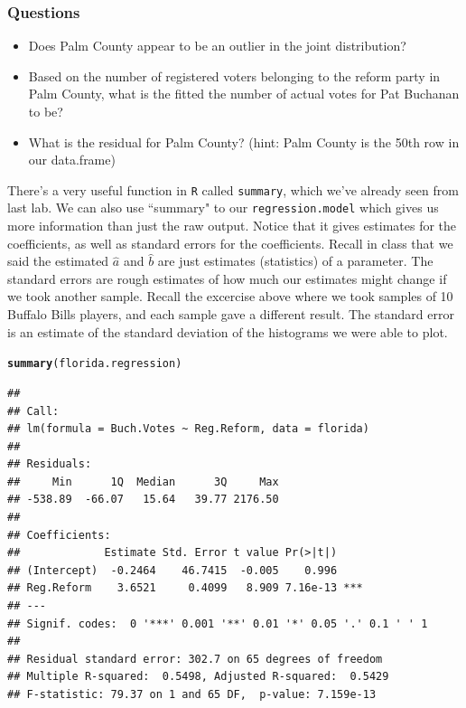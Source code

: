\documentclass{article}\usepackage[]{graphicx}\usepackage[]{color}
\makeatletter
\newcommand{\hlstd}[1]{\textcolor[rgb]{0.345,0.345,0.345}{#1}}%
\newcommand{\hlkwd}[1]{\textcolor[rgb]{0.737,0.353,0.396}{\textbf{#1}}}%
\newenvironment{kframe}{%
 \def\at@end@of@kframe{}%
 \ifinner\ifhmode%
  \def\at@end@of@kframe{\end{minipage}}%
  \begin{minipage}{\columnwidth}%
 \fi\fi%
 \def\FrameCommand##1{\hskip\@totalleftmargin \hskip-\fboxsep
 \colorbox{shadecolor}{##1}\hskip-\fboxsep
     \hskip-\linewidth \hskip-\@totalleftmargin \hskip\columnwidth}%
 \MakeFramed {\advance\hsize-\width
   \@totalleftmargin\z@ \linewidth\hsize
   \@setminipage}}%
 {\par\unskip\endMakeFramed%
 \at@end@of@kframe}
\newenvironment{knitrout}{}{} %
\makeatother
\begin{document}
\subsubsection*{Questions}
\begin{itemize}
\item Does Palm County appear to be an outlier in the joint distribution? 
\item Based on the number of registered voters belonging to the reform party in Palm County, what is the fitted the number of actual votes for Pat Buchanan to be?
\item What is the residual for Palm County? (hint: Palm County is the 50th row in our data.frame)
\end{itemize}


There's a very useful function in \texttt{R} called \texttt{summary}, which we've already seen from last lab. We can also use ``summary" to our \texttt{regression.model} which gives us more information than just the raw output. Notice that it gives estimates for the coefficients, as well as standard errors for the coefficients. Recall in class that we said the estimated $\hat a$ and $\hat b$ are just estimates (statistics) of a parameter. The standard errors are rough estimates of how much our estimates might change if we took another sample. Recall the excercise above where we took samples of 10 Buffalo Bills players, and each sample gave a different result. The standard error is an estimate of the standard deviation of the histograms we were able to plot.

\begin{knitrout}
\color{fgcolor}\begin{kframe}
\begin{alltt}
\hlkwd{summary}\hlstd{(florida.regression)}
\end{alltt}
\begin{verbatim}
## 
## Call:
## lm(formula = Buch.Votes ~ Reg.Reform, data = florida)
## 
## Residuals:
##     Min      1Q  Median      3Q     Max 
## -538.89  -66.07   15.64   39.77 2176.50 
## 
## Coefficients:
##             Estimate Std. Error t value Pr(>|t|)    
## (Intercept)  -0.2464    46.7415  -0.005    0.996    
## Reg.Reform    3.6521     0.4099   8.909 7.16e-13 ***
## ---
## Signif. codes:  0 '***' 0.001 '**' 0.01 '*' 0.05 '.' 0.1 ' ' 1
## 
## Residual standard error: 302.7 on 65 degrees of freedom
## Multiple R-squared:  0.5498,	Adjusted R-squared:  0.5429 
## F-statistic: 79.37 on 1 and 65 DF,  p-value: 7.159e-13
\end{verbatim}
\end{kframe}
\end{knitrout}
\end{document}
